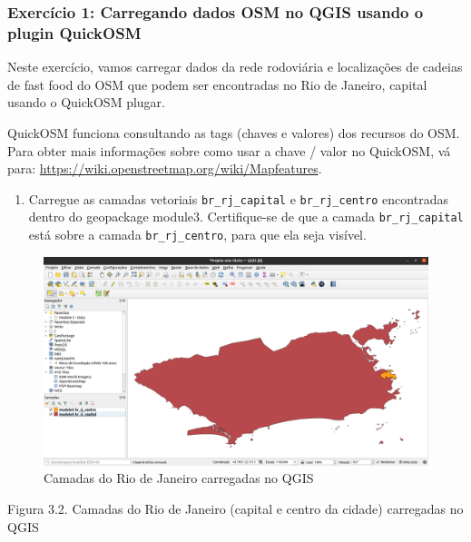 \documentclass[
]{book}
\providecommand{\tightlist}{%
  \setlength{\itemsep}{0pt}\setlength{\parskip}{0pt}}
\begin{document}
\hypertarget{exercuxedcio-1-carregando-dados-osm-no-qgis-usando-o-plugin-quickosm}{%
\subsubsection{\texorpdfstring{\textbf{Exercício 1: Carregando dados OSM no QGIS usando o plugin QuickOSM}}{Exercício 1: Carregando dados OSM no QGIS usando o plugin QuickOSM}}\label{exercuxedcio-1-carregando-dados-osm-no-qgis-usando-o-plugin-quickosm}}

Neste exercício, vamos carregar dados da rede rodoviária e localizações de cadeias de fast food do OSM que podem ser encontradas no Rio de Janeiro, capital usando o QuickOSM plugar.

QuickOSM funciona consultando as tags (chaves e valores) dos recursos do OSM. Para obter mais informações sobre como usar a chave / valor no QuickOSM, vá para: \href{https://wiki.openstreetmap.org/wiki/Mapfeatures.}{https://wiki.openstreetmap.org/wiki/Mapfeatures}.

\begin{enumerate}
\def\labelenumi{\arabic{enumi}.}
\tightlist
\item
  Carregue as camadas vetoriais \texttt{br\_rj\_capital} e \texttt{br\_rj\_centro} encontradas dentro do geopackage module3. Certifique-se de que a camada \texttt{br\_rj\_capital} está sobre a camada \texttt{br\_rj\_centro}, para que ela seja visível.
\end{enumerate}

\begin{figure}
\centering
\includegraphics{media/modulo3/quickosm-1.png}
\caption{Camadas do Rio de Janeiro carregadas no QGIS}
\end{figure}

Figura 3.2. Camadas do Rio de Janeiro (capital e centro da cidade) carregadas no QGIS
\end{document}
